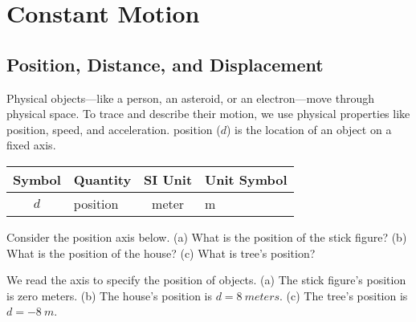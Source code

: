 \documentclass[../main.tex]{subfiles}
\begin{document}
\section{Constant Motion}

\subsection{Position, Distance, and Displacement} \label{pdfqW3}


Physical objects---like a person, an asteroid, or an electron---move through physical space. To trace and describe their motion, we use physical properties like position, speed, and acceleration. \Gls{position} ($d$) is the location of an object on a fixed axis.

\begin{center}
    \begin{tabular}{cl|cl}
    \hline
    \textbf{Symbol} & \textbf{Quantity} & \textbf{SI Unit} & \textbf{Unit Symbol}  \\
    \hline\hline
        $d$ & position & meter & m\\
    \hline
    \end{tabular}
\end{center}

\begin{example} \label{xNmqo7}
    Consider the position axis below. (a) What is the position of the stick figure? (b) What is the position of the house? (c) What is tree's position? 
\end{example}


\begin{center}
    \captionsetup{type=figure,margin=1in,font=scriptsize}
\end{center}

\Solution We read the axis to specify the position of objects. (a) The stick figure's position is zero meters. (b) The house's position is $d = \SI{8}{meters}$. (c) The tree's position is $d = \SI{-8}{m}$.
\end{document}
